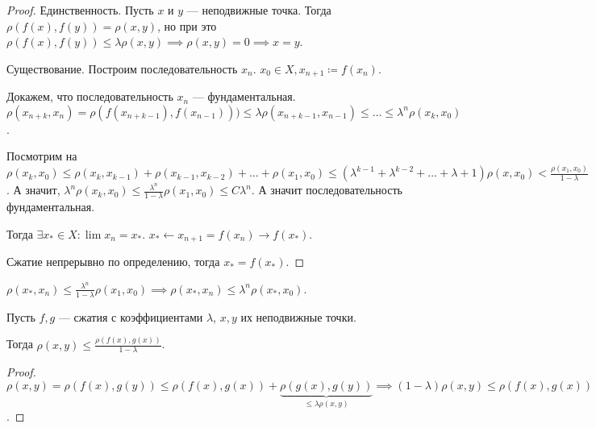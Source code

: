 \begin{proof}
    Единственность. Пусть $x$ и  $y$ --- неподвижные точка. Тогда  $\rho(f(x), f(y)) = \rho(x, y)$, но при это  $\rho(f(x), f(y)) \le \lambda\rho(x, y) \implies \rho(x, y) = 0 \implies x = y$.

    Существование. Построим последовательность $x_n$.  $x_0 \in X, x_{n+1} \coloneqq f(x_n)$.

    Докажем, что последовательность  $x_n$ --- фундаментальная.  $\rho(x_{n+k}, x_n) = \rho(f(x_{n+k-1}), f(x_{n-1}))) \le \lambda \rho(x_{n+k-1}, x_{n-1}) \le \ldots \le \lambda^n \rho(x_k, x_0)$. 

    Посмотрим на $\rho(x_k, x_0) \le \rho(x_k, x_{k-1}) + \rho(x_{k-1}, x_{k-2}) + \ldots + \rho(x_1, x_0) \le (\lambda^{k-1} + \lambda^{k-2} + \ldots + \lambda +1) \rho(x, x_0) < \frac{\rho(x_1, x_0)}{1-\lambda}$. А значит, $\lambda^n \rho(x_{k}, x_0) \le \frac{\lambda^n}{1-\lambda} \rho(x_1, x_0) \le C\lambda^n$. А значит последовательность фундаментальная.

    Тогда $\exists x_* \in X\!: \lim x_n = x_*$. $x_* \leftarrow x_{n+1} = f(x_n) \to f(x_*)$. 

    Сжатие непрерывно по определению, тогда $x_* = f(x_*)$.
\end{proof}
\begin{remark}
    $\rho(x_*, x_n) \le \frac{\lambda^n}{1 - \lambda}\rho(x_1, x_0) \implies \rho(x_*, x_n) \le \lambda^n \rho(x_*, x_0)$.
\end{remark}
\begin{consequence}
    Пусть $f, g$ --- сжатия с коэффициентами $\lambda$,  $x, y$ их неподвижные точки.

    Тогда $\rho(x, y) \le \frac{\rho(f(x), g(x))}{1-\lambda}$.
\end{consequence}
\begin{proof}
    $\rho(x, y) = \rho(f(x), g(y)) \le \rho(f(x), g(x)) + \underbrace{\rho(g(x), g(y))}_{\le \lambda \rho(x, y)} \implies (1-\lambda)\rho(x, y) \le \rho(f(x), g(x))$.
\end{proof}
